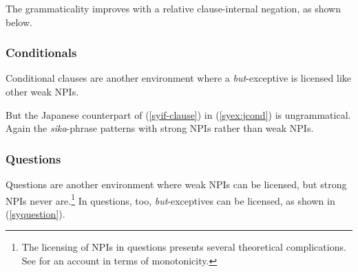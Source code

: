\documentclass[output=paper]{langscibook}
\begin{document}
\begin{sloppypar}
The grammaticality improves with a relative clause-internal negation, as shown below.
\end{sloppypar}

\z








   
\subsubsection{Conditionals}
Conditional clauses are another environment where a \emph{but}-exceptive is licensed like other weak NPIs.

\z

But the Japanese counterpart of (\ref{syif-clause}) in (\ref{syex:jcond}) is ungrammatical.  Again the \emph{sika}-phrase patterns with strong NPIs rather than weak NPIs.

\z

\subsubsection{Questions}
Questions are another environment where weak NPIs can be licensed, but strong NPIs never are.\footnote{The licensing of NPIs in questions presents several theoretical complications.  See \citet{nicolae15b} for an account in terms of monotonicity.} In questions, too, \emph{but}-exceptives can be licensed, as shown in (\ref{syquestion}).
\end{document}
